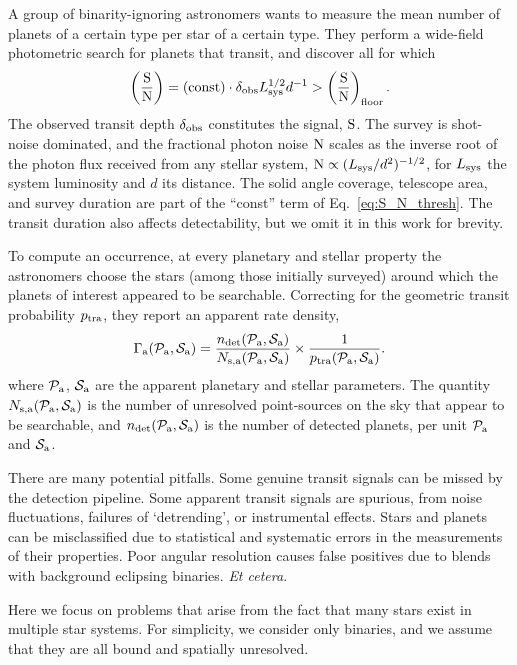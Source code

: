 \documentclass[12pt,modern]{aastex61}
\newcommand{\pp}{\mathcal{P}}
\newcommand{\ps}{\mathcal{S}}
\renewcommand{\a}{_{\rm a}}
\begin{document}
A group of binarity-ignoring astronomers wants to measure the mean number of 
planets of a certain type per star of a certain type.
They perform a wide-field photometric search for planets that transit, and 
discover all for which
\begin{equation}
\left(\frac{{\rm S}}{{\rm N}}\right)
= ({\rm const}) \cdot \delta_{\rm obs} L_{\rm sys}^{1/2} d^{-1}
> \left(\frac{{\rm S}}{{\rm N}}\right)_{\rm floor}.
\label{eq:S_N_thresh}
\end{equation}
The observed transit depth $\delta_{\rm obs}$ constitutes the signal, ${\rm 
S}$. The survey is shot-noise dominated, and the fractional photon noise 
${\rm N}$ scales as the inverse root of the photon flux received from any 
stellar system, ${\rm N} \propto (L_{\rm sys}/d^2)^{-1/2}$, for $L_{\rm sys}$ 
the system luminosity and $d$ its distance.
The solid angle coverage, telescope area, and survey duration are part of the 
``const'' term of Eq.~\ref{eq:S_N_thresh}. The transit duration also 
affects detectability, but we omit it in this work for brevity.

To compute an occurrence, at every planetary and stellar property the 
astronomers choose the stars (among those initially surveyed) around which the 
planets of interest appeared to be searchable.
Correcting for the geometric transit probability $p_{\rm tra}$, they report an 
apparent rate density,
\begin{equation}
\Gamma\a(\pp\a, \ps\a) = \frac{n_{\rm det}(\pp\a, \ps\a)}{N_{\rm s,a}(\pp\a, 
    \ps\a)} \times \frac{1}{p_{\rm tra}(\pp\a, \ps\a)}.
\label{eq:defn_apparent_rate_density}
\end{equation}
where $\pp\a$, $\ps\a$ are the apparent planetary and stellar parameters.
The quantity $N_{\rm s,a}(\pp\a, \ps\a)$ is the number of unresolved 
point-sources on the sky that appear to be searchable, and
$n_{\rm det}(\pp\a, \ps\a)$ is the number of detected planets, per unit 
$\pp\a$ and $\ps\a$. 


There are many potential pitfalls.  Some genuine transit signals can be missed
by the detection pipeline.  Some apparent transit signals are spurious, from
noise fluctuations, failures of `detrending', or instrumental effects.  Stars
and planets can be misclassified due to statistical and systematic errors in
the measurements of their properties.  Poor angular resolution causes false
positives due to blends with background eclipsing binaries. {\it Et cetera}.

Here we focus on problems that arise from the fact that many stars exist in 
multiple star systems.
For simplicity, we consider only binaries, and we assume that they are all 
bound and spatially unresolved.
\end{document}
